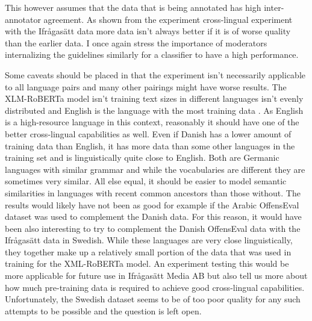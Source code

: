 \documentclass[nofilelist]{cslthse-msc}
\begin{document}
This however assumes that the data that is being annotated has high inter-annotator agreement. As shown from the experiment cross-lingual experiment with the Ifrågasätt data more data isn't always better if it is of worse quality than the earlier data. I once again stress the importance of moderators internalizing the guidelines similarly for a classifier to have a high performance.

Some caveats should be placed in that the experiment isn't necessarily applicable to all language pairs and many other pairings might have worse results. The XLM-RoBERTa model isn't training text sizes in different languages isn't evenly distributed and English is the language with the most training data \citep{DBLP:journals/corr/abs-1901-07291}. As English is a high-resource language in this context, reasonably it should have one of the better cross-lingual capabilities as well. Even if Danish has a lower amount of training data than English, it has more data than some other languages in the training set and is linguistically quite close to English. Both are Germanic languages with similar grammar and while the vocabularies are different they are sometimes very similar. All else equal, it should be easier to model semantic similarities in languages with recent common ancestors than those without. The results would likely have not been as good for example if the Arabic OffensEval dataset was used to complement the Danish data. For this reason, it would have been also interesting to try to complement the Danish OffensEval data with the Ifrågasätt data in Swedish. While these languages are very close linguistically, they together make up a relatively small portion of the data that was used in training for the XML-RoBERTa model. An experiment testing this would be more applicable for future use in Ifrågasätt Media AB but also tell us more about how much pre-training data is required to achieve good cross-lingual capabilities. Unfortunately, the Swedish dataset seems to be of too poor quality for any such attempts to be possible and the question is left open.






{}
\end{document}
